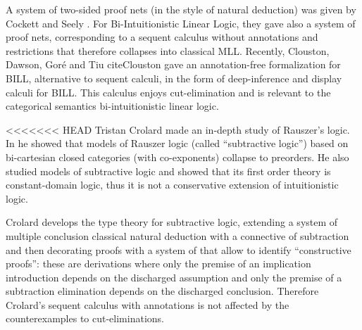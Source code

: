 {A system of two-sided proof nets (in the style of natural deduction)
was given by Cockett and Seely \cite{Cockett:1997}.  For
Bi-Intuitionistic Linear Logic, they gave also a system of proof nets,
corresponding to a sequent calculus without annotations and
restrictions that therefore collapses into classical MLL.  Recently,
Clouston, Dawson, Goré and Tiu cite{Clouston} gave an annotation-free
formalization for BILL, alternative to sequent calculi, in the form of
deep-inference and display calculi for BILL. This calculus enjoys
cut-elimination and is relevant to the categorical semantics
bi-intuitionistic linear logic.
 
<<<<<<< HEAD
Tristan Crolard \cite{Crolard:2001,Crolard:2004} made an in-depth study of Rauszer's logic. In \cite{Crolard:2001} he showed that models of Rauszer logic (called ``subtractive logic'') based on bi-cartesian closed categories (with co-exponents) collapse to preorders.
He also studied models of subtractive logic and showed that its first order theory is constant-domain logic, thus it is not 
a conservative extension of intuitionistic logic.

Crolard \cite{Crolard:2004} develops the type theory for subtractive logic, extending a system of multiple conclusion
classical natural deduction with a connective of subtraction and then decorating proofs with a system of \cite{annotations
of dependencies} that allow to identify ``constructive proofs'': these are derivations where only the premise of an implication introduction depends on the discharged assumption and only the premise of a subtraction elimination depends on the discharged conclusion. Therefore Crolard's sequent calculus with annotations is not affected by the 
counterexamples to cut-eliminations. 

}
